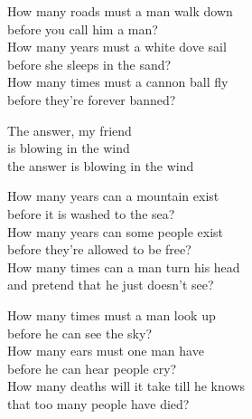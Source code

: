 
\ve
{}How many roads must a man walk down\\
before you call him a man?\\
How many years must a white dove sail\\
before she sleeps in the sand?\\
How many times must a cannon ball fly\\
before they're forever banned? 

\cho
The answer, my friend\\
is blowing in the wind\\
the answer is blowing in the wind 

\ve
How many years can a mountain exist\\
before it is washed to the sea?\\
How many years can some people exist\\
before they're allowed to be free?\\
How many times can a man turn his head\\
and pretend that he just doesn't see? 

\cho{}

\ve{}
How many times must a man look up\\
before he can see the sky?\\
How many ears must one man have\\
before he can hear people cry?\\
How many deaths will it take till he knows\\
that too many people have died?

\cho{}

\esong{}